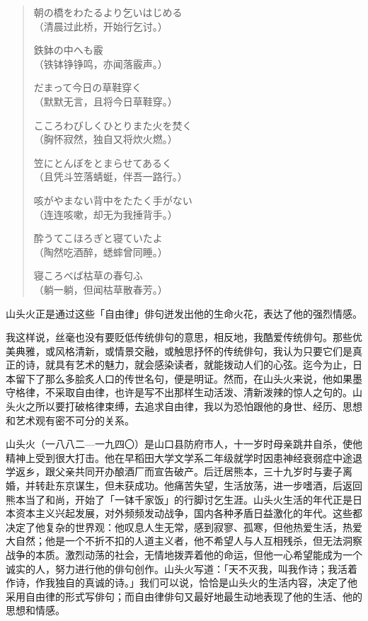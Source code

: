 {\begin{quote}
        {\FM 朝の橋をわたるより乞いはじめる}\\
        （清晨过此桥，开始行乞讨。）

        {\FM 鉄鉢の中へも霰}\\
        （铁钵铮铮鸣，亦闻落霰声。）

        {\FM だまって今日の草鞋穿く}\\
        （默默无言，且将今日草鞋穿。）

        {\FM こころわびしくひとりまた火を焚く}\\
        （胸怀寂然，独自又将炊火燃。）

        {\FM 笠にとんぼをとまらせてあるく}\\
        （且凭斗笠落蜻蜓，伴吾一路行。）

        {\FM 咳がやまない背中をたたく手がない}\\
        （连连咳嗽，却无为我捶背手。）

        {\FM 酔うてこほろぎと寝ていたよ}\\
        （陶然吃酒醉，蟋蟀曾同睡。）

        {\FM 寝ころべば枯草の春匂ふ}\\
        （躺一躺，但闻枯草散春芳。）
    \end{quote}

    山头火正是通过这些「自由律」俳句迸发出他的生命火花，表达了他的强烈情感。

    我这样说，丝毫也没有要贬低传统俳句的意思，相反地，我酷爱传统俳句。那些优美典雅，或风格清新，或情景交融，或触思抒怀的传统俳句，我认为只要它们是真正的诗，就具有艺术的魅力，就会感染读者，就能拨动人们的心弦。迄今为止，日本留下了那么多脍炙人口的传世名句，便是明证。然而，在山头火来说，他如果墨守格律，不采取自由律，也许是写不出那样生动活泼、清新泼辣的惊人之句的。山头火之所以要打破格律束缚，去追求自由律，我以为恐怕跟他的身世、经历、思想和艺术观有密不可分的关系。

    山头火（一八八二—一九四〇）是山口县防府市人，十一岁时母亲跳井自杀，使他精神上受到很大打击。他在早稻田大学文学系二年级就学时因患神经衰弱症中途退学返乡，跟父亲共同开办酿酒厂而宣告破产。后迁居熊本，三十九岁时与妻子离婚，并转赴东京谋生，但未获成功。他痛苦失望，生活放荡，进一步嗜酒，后返回熊本当了和尚，开始了「一钵千家饭」的行脚讨乞生涯。山头火生活的年代正是日本资本主义兴起发展，对外频频发动战争，国内各种矛盾日益激化的年代。这些都决定了他复杂的世界观：他叹息人生无常，感到寂寥、孤寒，但他热爱生活，热爱大自然；他是一个不折不扣的人道主义者，他不希望人与人互相残杀，但无法洞察战争的本质。激烈动荡的社会，无情地拨弄着他的命运，但他一心希望能成为一个诚实的人，努力进行他的俳句创作。山头火写道：「天不灭我，叫我作诗；我活着作诗，作我独自的真诚的诗。」我们可以说，恰恰是山头火的生活内容，决定了他采用自由律的形式写俳句；而自由律俳句又最好地最生动地表现了他的生活、他的思想和情感。

}
